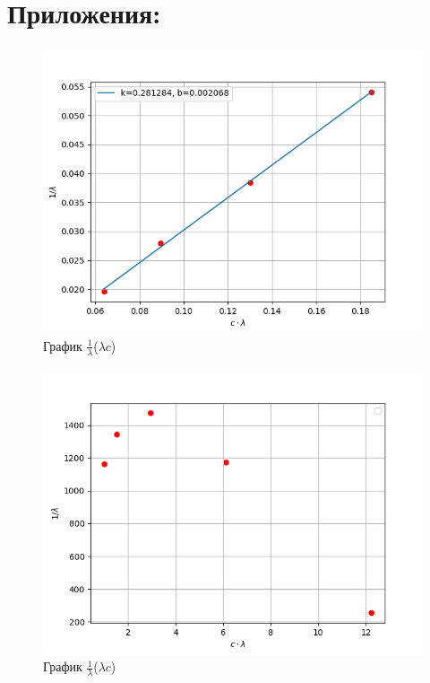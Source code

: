 \documentclass[a4paper,12pt]{article} %
\begin{document}
\section{Приложения:}
\begin{figure}[H]
    \centering
    \includegraphics[width = 180 mm]{image.png}
    \caption{График $\frac{1}{\lambda}$($\lambda c$)}
\end{figure}
\begin{figure}[H]
    \centering
    \includegraphics[width = 180 mm]{image2.png}
    \caption{График $\frac{1}{\lambda}$($\lambda c$)}
\end{figure}
\end{document}
